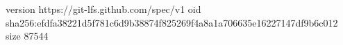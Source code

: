 version https://git-lfs.github.com/spec/v1
oid sha256:efdfa38221d5f781c6d9b38874f825269f4a8a1a706635e16227147df9b6c012
size 87544
